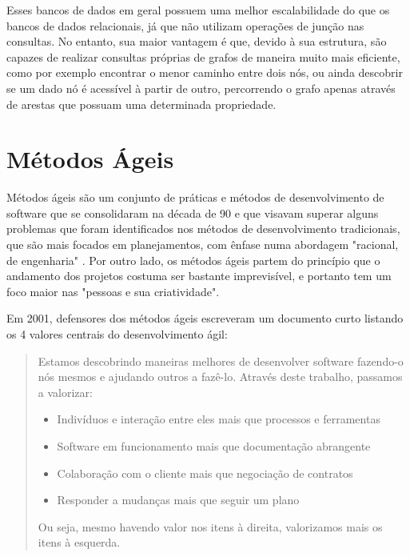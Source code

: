 
Esses bancos de dados em geral possuem uma melhor escalabilidade do que os bancos de dados relacionais, já que não utilizam operações de junção nas consultas.
No entanto, sua maior vantagem é que, devido à sua estrutura, são capazes de realizar consultas próprias de grafos de maneira muito mais eficiente, como por exemplo encontrar o menor caminho entre dois nós, ou ainda descobrir se um dado nó é acessível à partir de outro, percorrendo o grafo apenas através de arestas que possuam uma determinada propriedade.


\section{Métodos Ágeis}

Métodos ágeis são um conjunto de práticas e métodos de desenvolvimento de software que se consolidaram na década de 90 e que visavam superar alguns problemas que foram identificados nos métodos de desenvolvimento tradicionais, que são mais focados em planejamentos, com ênfase numa abordagem "racional, de engenharia" \cite{Dyba:2008:ESA:1379905.1379989}. Por outro lado, os métodos ágeis partem do princípio que o andamento dos projetos costuma ser bastante imprevisível, e portanto tem um foco maior nas "pessoas e sua criatividade".

Em 2001, defensores dos métodos ágeis escreveram um documento curto listando os 4 valores centrais do desenvolvimento ágil:

\begin{quote}
Estamos descobrindo maneiras melhores de desenvolver software fazendo-o nós mesmos e ajudando outros a fazê-lo. Através deste trabalho, passamos a valorizar:
\begin{itemize}

\item    Indivíduos e interação entre eles mais que processos e ferramentas
    
\item    Software em funcionamento mais que documentação abrangente
    
\item    Colaboração com o cliente mais que negociação de contratos

\item    Responder a mudanças mais que seguir um plano

\end{itemize}
Ou seja, mesmo havendo valor nos itens à direita, valorizamos mais os itens à esquerda.\cite{agilemanifesto}
\end{quote}

